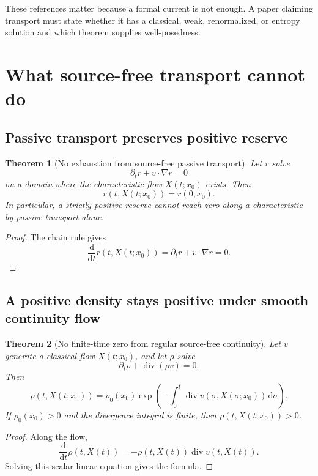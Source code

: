 \documentclass[11pt]{article}
\newtheorem{theorem}{Theorem}[section]
\theoremstyle{definition}
\theoremstyle{remark}
\newcommand{\dd}{\mathrm d}
\newcommand{\Div}{\operatorname{div}}
\begin{document}
These references matter because a formal current is not enough.  A paper
claiming transport must state whether it has a classical, weak,
renormalized, or entropy solution and which theorem supplies
well-posedness.

\section{What source-free transport cannot do}
\label{sec:nogo}

\subsection{Passive transport preserves positive reserve}

\begin{theorem}[No exhaustion from source-free passive transport]
\label{thm:passive}
Let \(r\) solve
\[
 \partial_t r+v\cdot\nabla r=0
\]
on a domain where the characteristic flow \(X(t;x_0)\) exists.  Then
\[
 r(t,X(t;x_0))=r(0,x_0).
\]
In particular, a strictly positive reserve cannot reach zero along a
characteristic by passive transport alone.
\end{theorem}

\begin{proof}
The chain rule gives
\[
 \frac{\dd}{\dd t}r(t,X(t;x_0))
=
\partial_t r+v\cdot\nabla r=0.
\]
\end{proof}

\subsection{A positive density stays positive under smooth continuity flow}

\begin{theorem}[No finite-time zero from regular source-free continuity]
\label{thm:densitypositive}
Let \(v\) generate a classical flow \(X(t;x_0)\), and let
\(\rho\) solve
\[
 \partial_t\rho+\Div(\rho v)=0.
\]
Then
\[
 \rho(t,X(t;x_0))
 =
 \rho_0(x_0)
 \exp\left(
 -\int_0^t\Div v(\sigma,X(\sigma;x_0))\,\dd\sigma
 \right).
\]
If \(\rho_0(x_0)>0\) and the divergence integral is finite, then
\(\rho(t,X(t;x_0))>0\).
\end{theorem}

\begin{proof}
Along the flow,
\[
 \frac{\dd}{\dd t}\rho(t,X(t))
=
-\rho(t,X(t))\Div v(t,X(t)).
\]
Solving this scalar linear equation gives the formula.
\end{proof}
\end{document}
